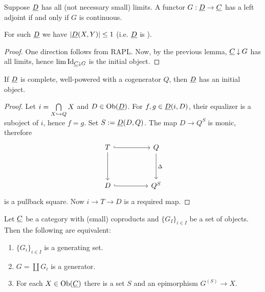 \begin{theorem*}
	Suppose \( \underline{D} \) has all (not necessary small) limits. A functor \( G: \underline{D} \to \underline{C} \) has a left adjoint if and only if \( G \) is continuous.
\end{theorem*}

\begin{remark*}
	For such \( \underline{D} \) we have \( |\underline{D}(X, Y)| \le 1 \) (i.e. \( \underline{D} \) is ).
\end{remark*}
\begin{proof}
	One direction follows from RAPL. Now, by the previous lemma, \( \underline{C} \mathbin{\downarrow} G \) has all limits, hence \( \lim \mathrm{Id}_{\underline{C} \mathbin{\downarrow} G} \) is the initial object.
\end{proof}

\begin{lemma*}
	If \( \underline{D} \) is complete, well-powered with a cogenerator \( Q \), then \( \underline{D} \) has an initial object.
\end{lemma*}
\begin{proof}
	Let \( i = \bigcap\limits_{X \hookrightarrow Q} X \) and \( D \in \operatorname{Ob}(\underline{D}) \). For \( f, g \in \underline{D}(i, D) \), their equalizer is a suboject of \( i \), hence \( f = g \). Set \( S := \underline{D}(D, Q) \). The map \( D \to Q^S \) is monic, therefore
	\[
		\begin{tikzcd}
			T && Q \\
			\\
			D && {Q^S}
			\arrow[hook, from=1-1, to=1-3]
			\arrow[from=1-1, to=3-1]
			\arrow["\Delta", from=1-3, to=3-3]
			\arrow[hook, from=3-1, to=3-3]
		\end{tikzcd}
	\]
	is a pullback square. Now \( i \to T \to D \) is a required map.
\end{proof}

\begin{proposition*}
	Let \( \underline{C} \) be a category with (small) coproducts and \( \{G_I\}_{i \in I} \) be a set of objects. Then the following are equivalent:
	\begin{enumerate}
		\item \( \{G_i\}_{i \in I} \) is a generating set.
		\item \( G = \coprod G_i \) is a generator.
		\item For each \( X \in \operatorname{Ob}(\underline{C}) \) there is a set \( S \) and an epimorphism \( G^{(S)} \to X \).
	\end{enumerate}
\end{proposition*}

